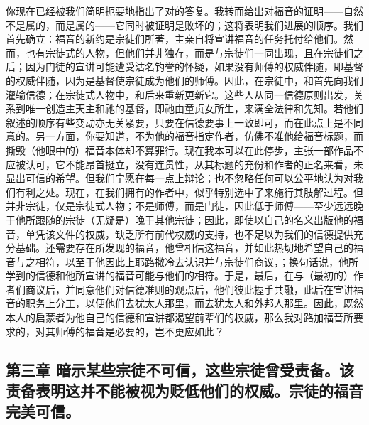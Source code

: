 你现在已经被我们简明扼要地指出了对的答复。我转而给出对福音的证明——自然不是属的，而是属的——它同时被证明是败坏的；这将表明我们进展的顺序。我们首先确立：福音的新约是宗徒们所著，主亲自将宣讲福音的任务托付给他们。然而，也有宗徒式的人物，但他们并非独存，而是与宗徒们一同出现，且在宗徒们之后；因为门徒的宣讲可能遭受沽名钓誉的怀疑，如果没有师傅的权威伴随，即基督的权威伴随，因为是基督使宗徒成为他们的师傅。因此，在宗徒中，和首先向我们灌输信德；在宗徒式人物中，和后来重新更新它。这些人从同一信德原则出发，关系到唯一创造主天主和祂的基督，即祂由童贞女所生，来满全法律和先知。若他们叙述的顺序有些变动亦无关紧要，只要在信德要事上一致即可，而在此点上是不同意的。另一方面，你要知道，不为他的福音指定作者，仿佛不准他给福音标题，而撕毁（他眼中的）福音本体却不算罪行。现在我本可以在此停步，主张一部作品不应被认可，它不能昂首挺立，没有连贯性，从其标题的充份和作者的正名来看，未显出可信的希望。但我们宁愿在每一点上辩论；也不忽略任何可以公平地认为对我们有利之处。现在，在我们拥有的作者中，似乎特别选中了来施行其肢解过程。但并非宗徒，仅是宗徒式人物；不是师傅，而是门徒，因此低于师傅——至少远远晚于他所跟随的宗徒（无疑是）晚于其他宗徒；因此，即使以自己的名义出版他的福音，单凭该文件的权威，缺乏所有前代权威的支持，也不足以为我们的信德提供充分基础。还需要存在所发现的福音，他曾相信这福音，并如此热切地希望自己的福音与之相符，以至于他因此上耶路撒冷去认识并与宗徒们商议，；换句话说，他所学到的信德和他所宣讲的福音可能与他们的相符。于是，最后，在与（最初的）作者们商议后，并同意他们对信德准则的观点后，他们彼此握手共融，此后在宣讲福音的职务上分工，以便他们去犹太人那里，而去犹太人和外邦人那里。因此，既然本人的启蒙者为他自己的信德和宣讲都渴望前辈们的权威，那么我对路加福音所要求的，对其师傅的福音是必要的，岂不更应如此？\par


\subsection{第三章 暗示某些宗徒不可信，这些宗徒曾受责备。该责备表明这并不能被视为贬低他们的权威。宗徒的福音完美可信。}

